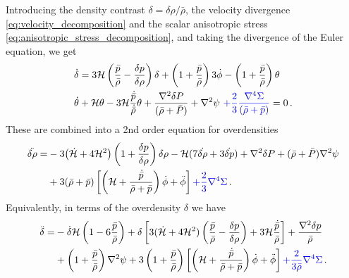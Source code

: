 Introducing the density contrast $\delta=\delta\rho/\bar{\rho}$, the velocity divergence \eqref{eq:velocity_decomposition} and the scalar anisotropic stress \eqref{eq:anisotropic_stress_decomposition}, and taking the divergence of the Euler equation, we get
\begin{align}
    &\dot{\delta}= 3\mathcal{H}\left(\frac{\bar{p}}{\bar{\rho}}-\frac{\delta p}{\delta\rho}\right)\delta + \left(1+\frac{\bar{p}}{\bar{\rho}}\right)3\dot{\phi} - \left(1+\frac{\bar{p}}{\bar{\rho}}\right)\theta\, \label{eq:continuity_overdensity_form}\\
    &\dot{\theta}+ \mathcal{H}\theta-3\mathcal{H}\frac{\dot{\bar{p}}}{\dot{\bar{\rho}}}\theta+\frac{\nabla^2\delta P}{(\bar{\rho}+\bar{P})}+\nabla^2\psi\,\,{\color{blue}+\frac{2}{3}\frac{\nabla^4 \Sigma}{(\bar{\rho}+\bar{p})}}=0\,.\label{eq:euler_divergence_form}
\end{align}
These are combined into a 2nd order equation for overdensities
\begin{align}
\begin{aligned}
    \ddot{\delta\rho}=&-3\big(\dot{\mathcal{H}}+4\mathcal{H}^2\big)\left(1+\frac{\delta p}{\delta\rho}\right)\delta\rho
    -\mathcal{H}(7\dot{\delta\rho}+3\dot{\delta p})+\nabla^2\delta P +(\bar{\rho}+\bar{P})\nabla^2\psi\\
    &+3(\bar{\rho}+\bar{p})\left[\left(\mathcal{H}+\frac{\dot{\bar{p}}}{\bar{\rho}+\bar{p}}\right)\dot{\phi}+\ddot{\phi}\right] {\color{blue}+ \frac{2}{3}\nabla^4\Sigma}\,.
\end{aligned}
\end{align}
Equivalently, in terms of the overdensity $\delta$ we have
\begin{align}
\begin{aligned}
    \ddot{\delta}=&-\dot{\delta}\mathcal{H}\left(1-6\frac{\bar{p}}{\bar{\rho}}\right)
    +\delta\left[3(\dot{\mathcal{H}}+4\mathcal{H}^2)\left(\frac{\bar{p}}{\bar{\rho}}-\frac{\delta p}{\delta\rho}\right)+3\mathcal{H}\frac{\dot{\bar{p}}}{\bar{\rho}}\right]
    +\frac{\nabla^2\delta p}{\bar{\rho}}\\
    & +\left(1+\frac{\bar{p}}{\bar{\rho}}\right)\nabla^2\psi
    +3\left(1+\frac{\bar{p}}{\bar{\rho}}\right)\left[\left(\mathcal{H}+\frac{\dot{\bar{p}}}{\bar{\rho}+\bar{p}}\right)\dot{\phi}+\ddot{\phi}\right] {\color{blue}+ \frac{2}{3\bar{\rho}}\nabla^4\Sigma}\,.
\end{aligned}
\end{align}



